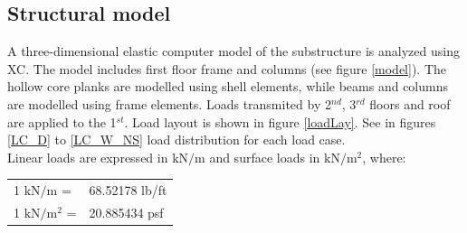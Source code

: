 \subsection{Structural model}
A three-dimensional elastic computer model of the substructure is analyzed using XC. The model includes first floor frame and columns (see figure \ref{model}). The hollow core planks are modelled using shell elements, while beams and columns are modelled using frame elements. Loads transmited by 2$^{nd}$, 3$^{rd}$ floors and roof are applied to the 1$^{st}$. Load layout is shown in figure \ref{loadLay}. See in figures \ref{LC_D} to \ref{LC_W_NS} load distribution for each load case.\\

Linear loads are expressed in $\mathrm{kN/m}$ and surface loads in $\mathrm{kN/m^2}$, where:\\
\begin{center}
  \begin{tabular}{ll}
    1 $\mathrm{kN/m}$ = & 68.52178 lb/ft \\
    1 $\mathrm{kN/m^2}$ = & 20.885434 psf \\
  \end{tabular}
  \end{center}

